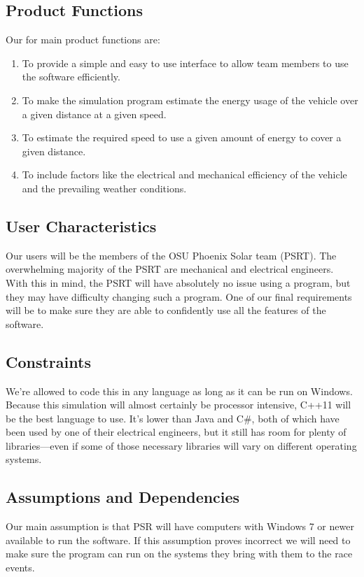\documentclass[onecolumn, draftclsnofoot,10pt, compsoc]{IEEEtran}
\begin{document}
\begin{singlespace}
    \subsection{Product Functions}          %
    Our for main product functions are: 
    \begin{enumerate}
        \item To provide a simple and easy to use interface to allow team members to use the software efficiently. 
        \item To make the simulation program estimate the energy usage of the vehicle over a given distance at a given speed.
        \item To estimate the required speed to use a given amount of energy to cover a given distance. 
        \item To include factors like the electrical and mechanical efficiency of the vehicle and the prevailing weather conditions. 
    \end{enumerate}
    
    \subsection{User Characteristics}
    Our users will be the members of the OSU Phoenix Solar team (PSRT). The overwhelming majority of the PSRT are mechanical and electrical engineers.
    With this in mind, the PSRT will have absolutely no issue using a program, but they may have difficulty changing such a program. 
    One of our final requirements will be to make sure they are able to confidently use all the features of the software.
    
    \subsection{Constraints}
    We're allowed to code this in any language as long as it can be run on Windows. 
    Because this simulation will almost certainly be processor intensive, C++11 will be the best language to use.
    It's lower than Java and C\#, both of which have been used by one of their electrical engineers, but it still has room for plenty of libraries---even if some of those necessary libraries will vary on different operating systems.
    
    \subsection{Assumptions and Dependencies}
    Our main assumption is that PSR will have computers with Windows 7 or newer available to run the software. If this assumption proves incorrect we will need to make sure the program can run on the systems they bring with them to the race events.
    

\end{singlespace}
\end{document}
